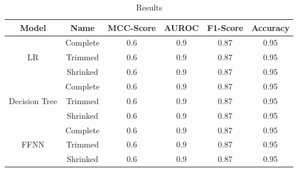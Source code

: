 \begin{table}[ht]
    \centering
    \begin{tabular}{c c c c c c}
        \toprule
        Model                          & Name     & \gls{MCC}-Score & \gls{AUROC} & F1-Score & Accuracy \\
        \midrule
        \multirow{3}{*}{\gls{LR}}      & Complete & 0.6             & 0.9         & 0.87     & 0.95     \\
                                       & Trimmed  & 0.6             & 0.9         & 0.87     & 0.95     \\
                                       & Shrinked & 0.6             & 0.9         & 0.87     & 0.95     \\
        \midrule
        \multirow{3}{*}{Decision Tree} & Complete & 0.6             & 0.9         & 0.87     & 0.95     \\
                                       & Trimmed  & 0.6             & 0.9         & 0.87     & 0.95     \\
                                       & Shrinked & 0.6             & 0.9         & 0.87     & 0.95     \\
        \midrule
        \multirow{3}{*}{\gls{FFNN}}    & Complete & 0.6             & 0.9         & 0.87     & 0.95     \\
                                       & Trimmed  & 0.6             & 0.9         & 0.87     & 0.95     \\
                                       & Shrinked & 0.6             & 0.9         & 0.87     & 0.95     \\
        \bottomrule
    \end{tabular}
    \caption{Results}
    \label{tab:dataset_model_selection_saveStrategy}
\end{table}

